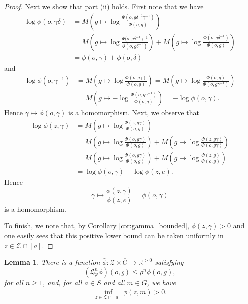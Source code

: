 \documentclass[11pt,letterpaper]{amsart}
\newtheorem{lemma}[theorem]{Lemma}
\theoremstyle{definition}
\numberwithin{equation}{section}
\numberwithin{theorem}{section}
\def\vp{\varphi}
\def\oG{\overline{G}}
\begin{document}
\begin{proof}
Next we show that part (ii) holds.
First note that we have
\begin{align*}
\log \phi(o,\gamma \delta) &=
M\left(g \mapsto \log \frac{\Phi(o,g\delta^{-1}\gamma^{-1})}{\Phi(o,g)}\right)
\\
&= M\left(g \mapsto \log \frac{\Phi(o,g\delta^{-1}\gamma^{-1}}{\Phi(o,g\delta^{-1})}\right)
+
M\left(g \mapsto \log \frac{\Phi(o,g\delta^{-1})}{\Phi(o,g)}\right)
\\
&=
\phi(o,\gamma) + \phi(o,\delta)
\end{align*}
and
\begin{align*}
\log \phi(o,\gamma^{-1}) 
&= 
M\left(g \mapsto \log \frac{\Phi(o,g\gamma)}{\Phi(o,g)}\right)
=
M\left(g \mapsto \log \frac{\Phi(o,g)}{\Phi(o,g\gamma^{-1})}\right)
\\
&= 
M\left(g \mapsto -\log \frac{\Phi(o,g\gamma^{-1})}{\Phi(o,g)}\right)
= -\log \phi(o,\gamma).
\end{align*}
Hence $\gamma \mapsto \phi(o,\gamma)$ is a homomorphism.
Next, we observe that
\begin{align*}
\log \phi(z,\gamma) &= 
M\left(g \mapsto \log \frac{\Phi(z,g\gamma)}{\Phi(o,g)}\right)
\\
&= M\left(g \mapsto \log \frac{\Phi(o,g\gamma)}{\Phi(o,g)}\right)
+
M\left(g \mapsto \log \frac{\Phi(z,g\gamma)}{\Phi(o,g\gamma)}\right)
\\
&= M\left(g \mapsto \log \frac{\Phi(o,g\gamma)}{\Phi(o,g)}\right)
+
M\left(g \mapsto \log \frac{\Phi(z,g)}{\Phi(o,g)}\right)
\\
&= \log \phi(o,\gamma) + \log \phi(z,e).
\end{align*}
Hence
\[
\gamma \mapsto \frac{\phi(z,\gamma)}{\phi(z,e)} = \phi(o,\gamma)
\]
is a homomorphism.

To finish, we note that, by Corollary \ref{cor:gamma_bounded}, $\phi(z,\gamma)>0$ and 
one easily sees that this positive lower bound can be taken uniformly in $z \in \mathcal Z \cap [a]$.
\end{proof}

\begin{lemma}\label{lem:inequality_for_phi_bar}
There is a function $\bar \phi : \mathcal Z \times \oG \to \mathbb R^{>0}$
satisfying 
\[
(\mathfrak L_{\vp}^n \bar \phi)(o,g)\le \rho^n \bar \phi(o,g),
\]
for all $n \ge 1$, and,
for all $a \in S$ and all $m \in \oG$, we have
\[
\inf_{z \in \mathcal Z \cap [a]} \bar \phi(z,m) >0.
\]
\end{lemma}
\end{document}
